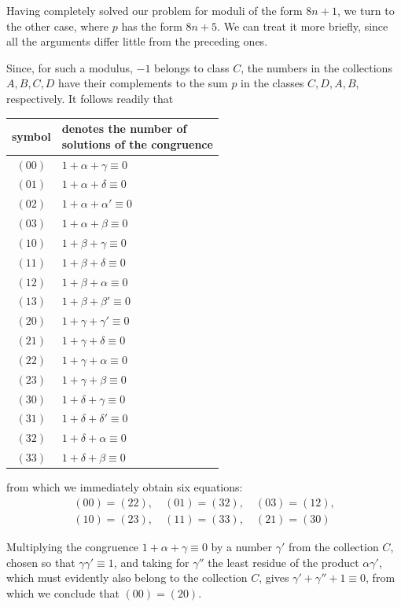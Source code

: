 Having completely solved our problem for moduli of the form $8n+1$, we turn to the other case, where $p$ has the form $8n+5$. We can treat it more briefly, since all the arguments differ little from the preceding ones.

Since, for such a modulus, $-1$ belongs to class $C$, the numbers in the collections $A,B,C,D$ have their complements to the sum $p$ in the classes $C,D,A,B$, respectively. It follows readily that

%
\begin{center}
\begin{tabular}{c|l}
symbol&\shortstack{denotes the number of\\solutions of the congruence}\\\hline
$(00)$&$1+\alpha+\gamma\equiv0$\\
$(01)$&$1+\alpha+\delta\equiv0$\\
$(02)$&$1+\alpha+\alpha'\equiv0$\\
$(03)$&$1+\alpha+\beta\equiv0$\\
$(10)$&$1+\beta+\gamma\equiv0$\\
$(11)$&$1+\beta+\delta\equiv0$\\
$(12)$&$1+\beta+\alpha\equiv0$\\
$(13)$&$1+\beta+\beta'\equiv0$\\
$(20)$&$1+\gamma+\gamma'\equiv0$\\
$(21)$&$1+\gamma+\delta\equiv0$\\
$(22)$&$1+\gamma+\alpha\equiv0$\\
$(23)$&$1+\gamma+\beta\equiv0$\\
$(30)$&$1+\delta+\gamma\equiv0$\\
$(31)$&$1+\delta+\delta'\equiv0$\\
$(32)$&$1+\delta+\alpha\equiv0$\\
$(33)$&$1+\delta+\beta\equiv0$
\end{tabular}
\end{center}
from which we immediately obtain six equations:
\[
\begin{gathered}
(00)=(22),\quad(01)=(32),\quad(03)=(12),\\
(10)=(23),\quad(11)=(33),\quad(21)=(30)
\end{gathered}
\]

Multiplying the congruence $1+\alpha+\gamma\equiv0$ by a number $\gamma'$ from the collection $C$, chosen so that $\gamma\gamma'\equiv1$, and taking for $\gamma''$ the least residue of the product $\alpha\gamma'$, which must evidently also belong to the collection $C$, gives $\gamma'+\gamma''+1\equiv0$, from which we conclude that $(00)=(20)$.

